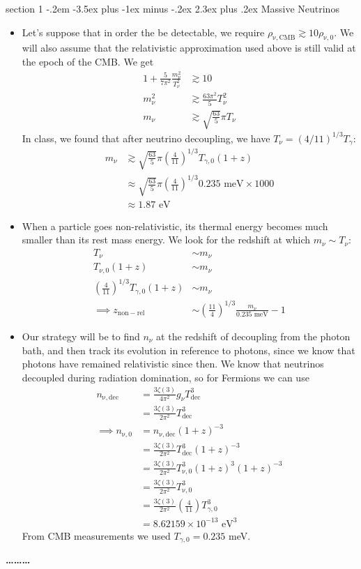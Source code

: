 \documentclass[12pt]{article}
\makeatletter
\newenvironment{problem}{\@startsection
	{section}
	{1}
	{-.2em}
	{-3.5ex plus -1ex minus -.2ex}
	{2.3ex plus .2ex}
	{\pagebreak[3]%
		\large\bf\noindent{Problem }
	}
}
{%
	\begin{center}\large\bf \ldots\ldots\ldots\end{center}}
\newcommand{\rhox}[1]{\ensuremath{\rho_\mathrm{#1} } }
\makeatother
\begin{document}
\begin{problem}{Massive Neutrinos}
\begin{itemize}
		\item Let's suppose that in order the be detectable, we require $\rhox{\nu,CMB} \gtrsim 10 \rhox{\nu,0}$.  We will also assume that the relativistic approximation used above is still valid at the epoch of the CMB. We get \begin{align*}
			1 + \frac{5}{7\pi^2 }\frac{m_\nu^2}{T_\nu^2} &\gtrsim 10
			\\
			m_\nu^2 &\gtrsim \frac{63\pi^2}{5}T_\nu^2
			\\
			m_\nu &\gtrsim \sqrt{\frac{63}{5}}\pi T_\nu
			\end{align*} In class, we found that after neutrino decoupling, we have $T_\nu = (4/11)^{1/3}T_\gamma$: \begin{align*}
			m_\nu &\gtrsim \sqrt{\frac{63}{5}}\pi \left(\frac{4}{11}\right)^{1/3} T_{\gamma,0} (1+z)
			\\
			&\approx \sqrt{\frac{63}{5}}\pi \left(\frac{4}{11}\right)^{1/3} 0.235 \text{ meV} \times 1000 
			\\
			&\approx \boxed{1.87 \text{ eV}}
		\end{align*}
		
		\item When a particle goes non-relativistic, its thermal energy becomes much smaller than its rest mass energy.  We look for the redshift at which $m_\nu \sim T_\nu$: \begin{align*}
			T_\nu &\sim m_\nu
			\\
			T_{\nu,0}(1 + z) &\sim m_\nu
			\\
			 \left(\frac{4}{11}\right)^{1/3} T_{\gamma,0} (1+z) &\sim m_\nu
			 \\
			 \implies z_\mathrm{non-rel} &\sim \left(\frac{11}{4}\right)^{1/3} \frac{m_\nu}{0.235 \text{ meV}} - 1
		\end{align*}
		
		\item Our strategy will be to find $n_\nu$ at the redshift of decoupling from the photon bath, and then track its evolution in reference to photons, since we know that photons have remained relativistic since then.  We know that neutrinos decoupled during radiation domination, so for Fermions we can use \begin{align*}
			n_\mathrm{\nu,dec} &= \frac{3\zeta(3)}{4\pi^2}g_\nu T_\mathrm{dec}^3
			\\
			&= \frac{3\zeta(3)}{2\pi^2} T_\mathrm{dec}^3
			\\
			\implies n_\mathrm{\nu,0} &= n_\mathrm{\nu,dec} (1+z)^{-3}
			\\
			&= \frac{3\zeta(3)}{2\pi^2} T_\mathrm{dec}^3(1+z)^{-3}
			\\
			&= \frac{3\zeta(3)}{2\pi^2} T_\mathrm{\nu,0}^3(1+z)^{3}(1+z)^{-3}
			\\
			&= \frac{3\zeta(3)}{2\pi^2} T_\mathrm{\nu,0}^3
			\\
			&= \frac{3\zeta(3)}{2\pi^2} \left(\frac{4}{11}\right) T_{\gamma,0}^3
			\\
			&= 8.62159\times 10^{-13} \text{ eV}^3
		\end{align*} From CMB measurements we used $T_{\gamma,0} = 0.235$ meV.
		

\end{itemize}
\end{problem}
\end{document}
